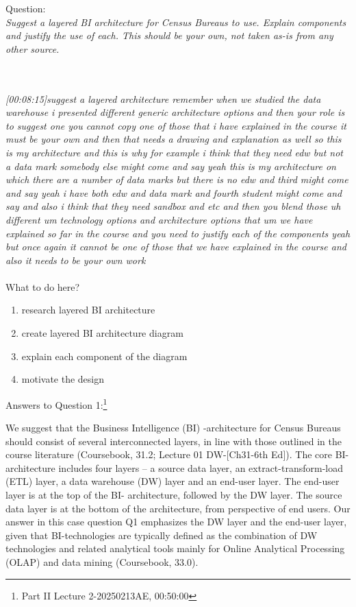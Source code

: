 Question\cite{CourseLitt}:\\
\emph{Suggest a layered BI architecture for Census Bureaus to use. Explain components and
justify the use of each. This should be your own, not taken as-is from any other source.}

\\\\
\emph{[00:08:15]suggest a layered architecture remember when we studied the data warehouse i presented
different generic architecture options and then your role is to suggest one you cannot copy one of those that i have explained in the course it must be your own
and then that needs a drawing and explanation as well so this is my architecture and this is why for example
i think that they need edw but not a data mark somebody else might come and say
yeah this is my architecture on which there are a number of data marks but there is no edw and third might come
and say yeah i have both edw and data mark and fourth student might come and say and also i think that they need sandbox and etc and then you blend those
uh different um technology options and architecture options that um we have explained so far in the course and you need to justify each of the components
yeah but once again it cannot be one of those that we have explained in the course and also it needs to be your own work}\\\\
What to do here?
\begin{enumerate}
    \item research layered BI architecture
    \item create layered BI architecture diagram
    \item explain each component of the diagram
    \item motivate the design
  \end{enumerate}

\newpage Answers to Question 1:\footnote{Part II Lecture 2-20250213AE, 00:50:00}

We suggest that the Business Intelligence (BI) -architecture for Census Bureaus should consist of several interconnected layers, in line with those outlined in the course literature (Coursebook, 31.2; Lecture 01 DW-[Ch31-6th Ed]). The core BI-architecture includes four layers – a source data layer, an extract-transform-load (ETL) layer, a data warehouse (DW) layer and an end-user layer. The end-user layer is at the top of the BI- architecture, followed by the DW layer. The source data layer is at the bottom of the architecture, from perspective of end users. Our answer in this case question Q1 emphasizes the DW layer and the end-user layer, given that BI-technologies are typically defined as the combination of DW technologies and related analytical tools mainly for Online Analytical Processing (OLAP) and data mining (Coursebook, 33.0).  

